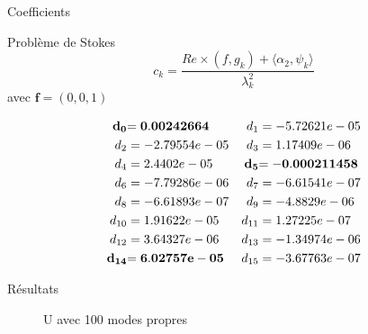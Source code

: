 \documentclass{beamer}
\begin{document}
\begin{frame}{Coefficients}
\begin{block}{Problème de Stokes}
\[
c_k = \frac{Re\times (f,g_k)+\langle \alpha_2,\psi_k\rangle}{\lambda_k^2}
\]
avec $\bm{f}=(0,0,1)$
\end{block}
\begin{align*}
\bf{d_{0}} &\bf{= 0.00242664} & d_{1} &= -5.72621e-05\\
d_{2} &= -2.79554e-05 & d_{3} &= 1.17409e-06\\
d_{4} &= 2.4402e-05 & \bf{d_{5}} &\bf{= -0.000211458}\\
d_{6} &= -7.79286e-06 & d_{7} &= -6.61541e-07\\
d_{8} &= -6.61893e-07 & d_{9} &= -4.8829e-06\\
d_{10} &= 1.91622e-05 & d_{11} &= 1.27225e-07\\
d_{12} &= 3.64327e-06 & d_{13} &= -1.34974e-06\\
\bf{d_{14}} &\bf{= 6.02757e-05} & d_{15} &= -3.67763e-07
\end{align*}
\end{frame}

\begin{frame}{Résultats}
\begin{figure}[H]
\caption{U avec 100 modes propres}
\end{figure}
\end{frame}
\end{document}
